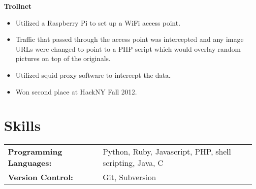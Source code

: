 \documentclass[centered,overlapped]{res}
\begin{document}
\begin{resume}
	{\bf Trollnet}
	\begin{itemize} \itemsep -2pt
		\item Utilized a Raspberry Pi to set up a WiFi access point.
		\item Traffic that passed through the access point was intercepted and
            any image URLs were changed to point to a PHP script which would
            overlay random pictures on top of the originals.
		\item Utilized squid proxy software to intercept the data.
		\item Won second place at HackNY Fall 2012.
	\end{itemize}

\section{Skills}
	\begin{tabular}{l l}
		\noindent \textbf{Programming Languages:} & Python, Ruby, Javascript, PHP, shell scripting, Java, C \\
		\noindent \textbf{Version Control:} & Git, Subversion \\
	\end{tabular}

\end{resume}
\end{document}
